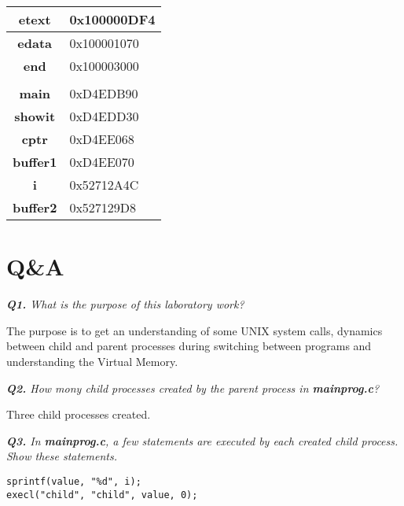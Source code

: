 \documentclass[11pt]{article}
\begin{document}
\vspace{10mm}
\hspace{45mm}
\begin{tabular}{|c|l|}
\hline
\textbf{etext}   & 0x100000DF4 \\ \hline
\textbf{edata}   & 0x100001070 \\ \hline
\textbf{end}     & 0x100003000 \\ \hline
\textbf{}        &             \\ \hline
\textbf{main}    & 0xD4EDB90   \\ \hline
\textbf{showit}  & 0xD4EDD30   \\ \hline
\textbf{cptr}    & 0xD4EE068   \\ \hline
\textbf{buffer1} & 0xD4EE070   \\ \hline
\textbf{i}       & 0x52712A4C  \\ \hline
\textbf{buffer2} & 0x527129D8  \\ \hline
\end{tabular}



\newpage

\section*{Q\&A}

\textit{\textbf{Q1.} What is the purpose of this laboratory work?}
\vspace{3mm}

The purpose is to get an understanding of some UNIX system calls, dynamics between child and parent processes during switching between programs and understanding the Virtual Memory.

\vspace{3mm}
\textit{\textbf{Q2.} How mony child processes created by the parent process in \textbf{mainprog.c}?}
\vspace{3mm}

Three child processes created.

\vspace{3mm}
\textit{\textbf{Q3.} In \textbf{mainprog.c}, a few statements are executed by each created child process. Show these statements.}
\vspace{3mm}

\begin{lstlisting}[frame=tlrb]
sprintf(value, "%d", i);
execl("child", "child", value, 0);
\end{lstlisting}
\end{document}
